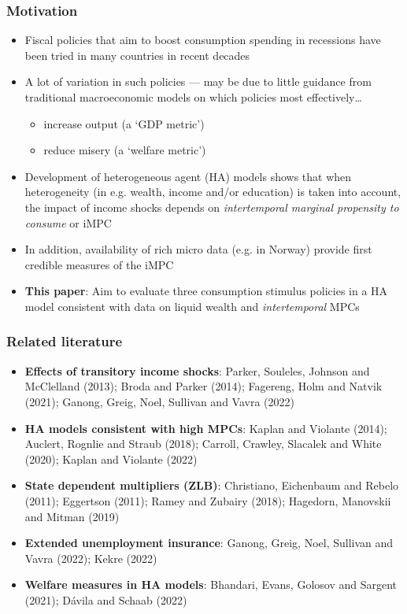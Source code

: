 \documentclass[pdflatex,aspectratio=169]{beamer}
\begin{document}
\begin{frame}
	\frametitle{Motivation}
	\begin{itemize}[<+->]
		\itemsep = .5\bigskipamount 
		\item Fiscal policies that aim to boost consumption spending in recessions have been tried in many countries in recent decades 
		\item A lot of variation in such policies --- may be due to little guidance from traditional macroeconomic models on which policies most effectively\ldots 
		\begin{itemize}
			\itemsep = .25\bigskipamount 
			\item increase output (a `GDP metric')
			\item reduce misery (a `welfare metric')
		\end{itemize}
		\item Development of heterogeneous agent (HA) models shows that when heterogeneity (in e.g. wealth, income and/or education) is taken into account, the impact of income shocks depends on \textit{intertemporal marginal propensity to consume} or iMPC 
		\item In addition, availability of rich micro data (e.g. in Norway) provide first credible measures of the iMPC 
		\item \textbf{This paper}: Aim to evaluate three consumption stimulus policies in a HA model consistent with data on liquid wealth and \textit{intertemporal} MPCs 
	\end{itemize}
\end{frame}


\begin{frame}
  \frametitle{Related literature}
  \small
  \begin{itemize}[<+->]
  \item \textbf{Effects of transitory income shocks}: 
    Parker, Souleles, Johnson and McClelland (2013); Broda and Parker (2014); Fagereng, Holm and Natvik (2021); Ganong, Greig, Noel, Sullivan and Vavra (2022)
  \item \textbf{HA models consistent with high MPCs}: 
    Kaplan and Violante (2014); Auclert, Rognlie and Straub (2018); Carroll, Crawley, Slacalek and White (2020); Kaplan and Violante (2022) 
  \item \textbf{State dependent multipliers (ZLB)}: 
    Christiano, Eichenbaum and Rebelo (2011); Eggertson (2011); Ramey and Zubairy (2018); Hagedorn, Manovskii and Mitman (2019) 
  \item \textbf{Extended unemployment insurance}:
    Ganong, Greig, Noel, Sullivan and Vavra (2022); Kekre (2022) 
  \item \textbf{Welfare measures in HA models}:
    Bhandari, Evans, Golosov and Sargent (2021); D{\'a}vila and Schaab (2022)
  \end{itemize}
  \normalsize
\end{frame}
\end{document}

